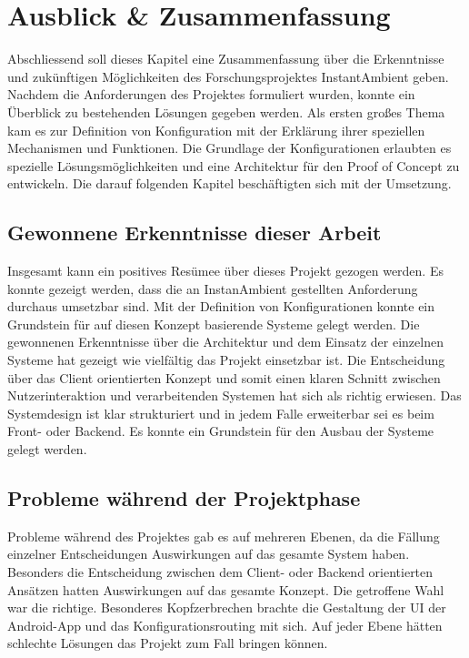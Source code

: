 \chapter{Ausblick & Zusammenfassung}
Abschliessend soll dieses Kapitel eine Zusammenfassung über die Erkenntnisse und zukünftigen Möglichkeiten des Forschungsprojektes InstantAmbient geben. 
Nachdem die Anforderungen des Projektes formuliert wurden, konnte ein Überblick zu bestehenden Lösungen gegeben werden. Als ersten großes Thema kam es zur Definition von Konfiguration mit der Erklärung ihrer speziellen Mechanismen und Funktionen. Die Grundlage der Konfigurationen erlaubten es spezielle Lösungsmöglichkeiten und eine Architektur für den Proof of Concept zu entwickeln. Die darauf folgenden Kapitel beschäftigten sich mit der Umsetzung.

\section{Gewonnene Erkenntnisse dieser Arbeit}
Insgesamt kann ein positives Resümee über dieses Projekt gezogen werden. Es konnte gezeigt werden, dass die an InstanAmbient gestellten Anforderung durchaus umsetzbar sind. Mit der Definition von Konfigurationen konnte ein Grundstein für auf diesen Konzept basierende Systeme gelegt werden. Die gewonnenen Erkenntnisse über die Architektur und dem Einsatz der einzelnen Systeme hat gezeigt wie vielfältig das Projekt einsetzbar ist. Die Entscheidung über das Client orientierten Konzept und somit einen klaren Schnitt zwischen Nutzerinteraktion und verarbeitenden Systemen hat sich als richtig erwiesen. Das Systemdesign ist klar strukturiert und in jedem Falle erweiterbar sei es beim Front- oder Backend. Es konnte ein Grundstein für den Ausbau der Systeme gelegt werden.

\section{Probleme während der Projektphase}
Probleme während des Projektes gab es auf mehreren Ebenen, da die Fällung einzelner Entscheidungen Auswirkungen auf das gesamte System haben. Besonders die Entscheidung zwischen dem Client- oder Backend orientierten Ansätzen hatten Auswirkungen auf das gesamte Konzept. Die getroffene Wahl war die richtige. Besonderes Kopfzerbrechen brachte die Gestaltung der UI der Android-App und das Konfigurationsrouting mit sich. Auf jeder Ebene hätten schlechte Lösungen das Projekt zum Fall bringen können. 

